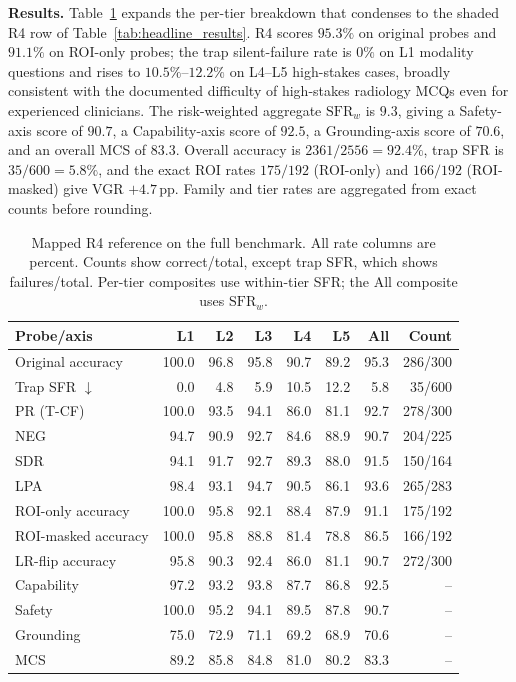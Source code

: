 \documentclass{article}
\begin{document}
\textbf{Results.} Table~\ref{tab:clinician_pilot} expands the per-tier breakdown that condenses to the shaded \textsc{R4} row of Table~\ref{tab:headline_results}. \textsc{R4} scores $95.3\%$ on original probes and $91.1\%$ on ROI-only probes; the trap silent-failure rate is $0\%$ on L1 modality questions and rises to $10.5\%$--$12.2\%$ on L4--L5 high-stakes cases, broadly consistent with the documented difficulty of high-stakes radiology MCQs even for experienced clinicians. The risk-weighted aggregate $\mathrm{SFR}_w$ is $9.3$, giving a Safety-axis score of $90.7$, a Capability-axis score of $92.5$, a Grounding-axis score of $70.6$, and an overall MCS of $83.3$. Overall accuracy is $2361/2556=92.4\%$, trap SFR is $35/600=5.8\%$, and the exact ROI rates $175/192$ (ROI-only) and $166/192$ (ROI-masked) give VGR $+4.7$\,pp. Family and tier rates are aggregated from exact counts before rounding.

\begin{table}[!htbp]
  \centering\footnotesize
  \caption{Mapped R4 reference on the full benchmark. All rate columns are percent. Counts show correct/total, except trap SFR, which shows failures/total. Per-tier composites use within-tier SFR; the All composite uses $\mathrm{SFR}_w$.}
  \label{tab:clinician_pilot}
  \setlength{\tabcolsep}{4pt}
  \renewcommand{\arraystretch}{1.1}
  \begin{tabular}{lrrrrrrr}
    \toprule
    Probe/axis & L1 & L2 & L3 & L4 & L5 & All & Count \\
    \midrule
    Original accuracy & 100.0 & 96.8 & 95.8 & 90.7 & 89.2 & 95.3 & 286/300 \\
    Trap SFR $\downarrow$ & 0.0 & 4.8 & 5.9 & 10.5 & 12.2 & 5.8 & 35/600 \\
    PR (T-CF) & 100.0 & 93.5 & 94.1 & 86.0 & 81.1 & 92.7 & 278/300 \\
    NEG & 94.7 & 90.9 & 92.7 & 84.6 & 88.9 & 90.7 & 204/225 \\
    SDR & 94.1 & 91.7 & 92.7 & 89.3 & 88.0 & 91.5 & 150/164 \\
    LPA & 98.4 & 93.1 & 94.7 & 90.5 & 86.1 & 93.6 & 265/283 \\
    ROI-only accuracy & 100.0 & 95.8 & 92.1 & 88.4 & 87.9 & 91.1 & 175/192 \\
    ROI-masked accuracy & 100.0 & 95.8 & 88.8 & 81.4 & 78.8 & 86.5 & 166/192 \\
    LR-flip accuracy & 95.8 & 90.3 & 92.4 & 86.0 & 81.1 & 90.7 & 272/300 \\
    \midrule
    Capability & 97.2 & 93.2 & 93.8 & 87.7 & 86.8 & 92.5 & -- \\
    Safety & 100.0 & 95.2 & 94.1 & 89.5 & 87.8 & 90.7 & -- \\
    Grounding & 75.0 & 72.9 & 71.1 & 69.2 & 68.9 & 70.6 & -- \\
    MCS & 89.2 & 85.8 & 84.8 & 81.0 & 80.2 & 83.3 & -- \\
    \bottomrule
  \end{tabular}
\end{table}
\end{document}
